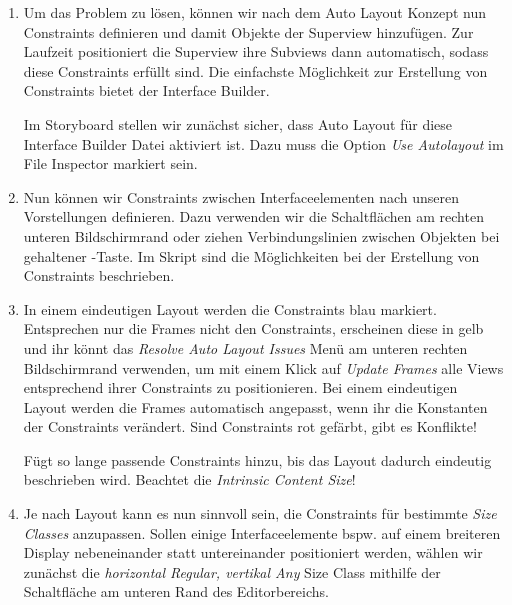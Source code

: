 \documentclass[parskip=half, final]{scrreprt}
\begin{document}
\begin{lecture}
\begin{enumerate}

\item Um das Problem zu lösen, können wir nach dem Auto Layout Konzept nun Constraints definieren und damit  Objekte der Superview hinzufügen. Zur Laufzeit positioniert die Superview ihre Subviews dann automatisch, sodass diese Constraints erfüllt sind. Die einfachste Möglichkeit zur Erstellung von Constraints bietet der Interface Builder.

	Im Storyboard stellen wir zunächst sicher, dass Auto Layout für diese Interface Builder Datei aktiviert ist. Dazu muss die Option \emph{Use Autolayout} im File Inspector markiert sein.

\item Nun können wir Constraints zwischen Interfaceelementen nach unseren Vorstellungen definieren. Dazu verwenden wir die Schaltflächen am rechten unteren Bildschirmrand oder ziehen Verbindungslinien zwischen Objekten bei gehaltener \keys{\ctrl}-Taste. Im Skript sind die Möglichkeiten bei der Erstellung von Constraints beschrieben.

\item In einem eindeutigen Layout werden die Constraints blau markiert. Entsprechen nur die Frames nicht den Constraints, erscheinen diese in gelb und ihr könnt das \emph{Resolve Auto Layout Issues} Menü am unteren rechten Bildschirmrand verwenden, um mit einem Klick auf \emph{Update Frames} alle Views entsprechend ihrer Constraints zu positionieren. Bei einem eindeutigen Layout werden die Frames automatisch angepasst, wenn ihr die Konstanten der Constraints verändert. Sind Constraints rot gefärbt, gibt es Konflikte!

Fügt so lange passende Constraints hinzu, bis das Layout dadurch eindeutig beschrieben wird.  Beachtet die \emph{Intrinsic Content Size}!

\item Je nach Layout kann es nun sinnvoll sein, die Constraints für bestimmte \emph{Size Classes} anzupassen. Sollen einige Interfaceelemente bspw. auf einem breiteren Display nebeneinander statt untereinander positioniert werden, wählen wir zunächst die \emph{horizontal Regular, vertikal Any} Size Class mithilfe der Schaltfläche am unteren Rand des Editorbereichs.


\end{enumerate}
\end{lecture}
\end{document}
